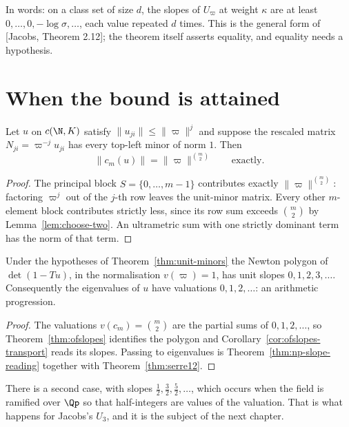 In words: on a class set of size $d$, the slopes of $U_\varpi$ at weight $\kappa$ are at least
$0, \dots, 0, -\log\sigma, \dots$, each value repeated $d$ times.  This is the general form of
[Jacobs, Theorem 2.12]; the theorem itself asserts equality, and equality needs a hypothesis.

\section{When the bound is attained}

\begin{theorem}
  \label{thm:unit-minors}
  \leanok
  Let $u$ on $c(\N,K)$ satisfy $\lVert u_{ji}\rVert \leq \lVert \varpi \rVert^j$ and suppose the
  rescaled matrix $N_{ji} = \varpi^{-j} u_{ji}$ has every top-left minor of norm $1$.  Then
  \[
    \lVert c_m(u) \rVert = \lVert \varpi \rVert^{\binom{m}{2}} \qquad \text{exactly}.
  \]
\end{theorem}

\begin{proof}
  \leanok
  The principal block $S = \{0,\dots,m-1\}$ contributes exactly $\lVert\varpi\rVert^{\binom
  m2}$: factoring $\varpi^j$ out of the $j$-th row leaves the unit-minor matrix.  Every other
  $m$-element block contributes strictly less, since its row sum exceeds $\binom m2$ by
  Lemma~\ref{lem:choose-two}.  An ultrametric sum with one strictly dominant term has the norm of
  that term.
\end{proof}

\begin{corollary}
  \label{cor:slope-reading}
  \leanok
  Under the hypotheses of Theorem~\ref{thm:unit-minors} the Newton polygon of $\det(1-Tu)$, in
  the normalisation $v(\varpi) = 1$, has unit slopes $0, 1, 2, 3, \dots$.  Consequently the
  eigenvalues of $u$ have valuations $0, 1, 2, \dots$: an arithmetic progression.
\end{corollary}

\begin{proof}
  \leanok
  The valuations $v(c_m) = \binom m2$ are the partial sums of $0,1,2,\dots$, so
  Theorem~\ref{thm:ofslopes} identifies the polygon and
  Corollary~\ref{cor:ofslopes-transport} reads its slopes.  Passing to eigenvalues is
  Theorem~\ref{thm:np-slope-reading} together with Theorem~\ref{thm:serre12}.
\end{proof}

There is a second case, with slopes $\tfrac12, \tfrac32, \tfrac52, \dots$, which occurs when the
field is ramified over $\Qp$ so that half-integers are values of the valuation.  That is what
happens for Jacobs's $U_3$, and it is the subject of the next chapter.
